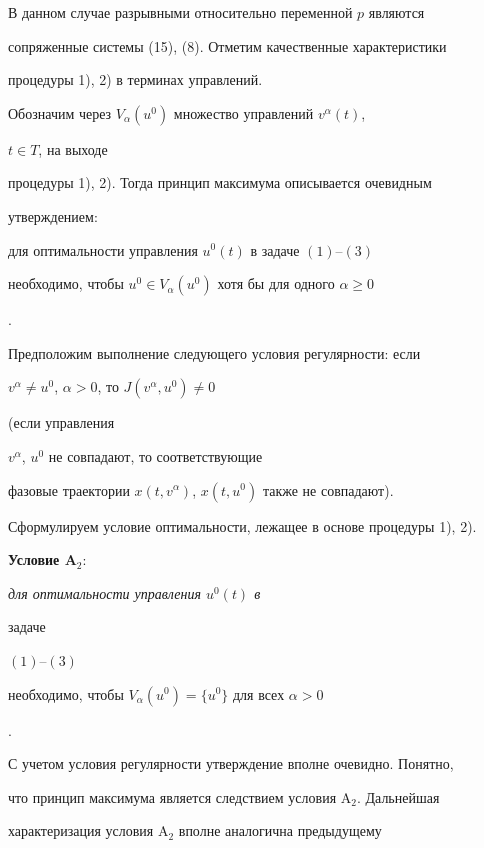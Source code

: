  


В данном случае разрывными относительно переменной $p$ являются 


сопряженные системы (15), (8). Отметим качественные характеристики 


процедуры 1), 2) в терминах управлений. 


 


Обозначим через $V_\alpha(u^0)$ множество управлений $v^\alpha(t)$, 


$t\in T$, на выходе 


процедуры 1), 2). Тогда принцип максимума описывается очевидным 


утверждением:


{\it


для оптимальности управления $u^0(t)$ в задаче $(1)$--$(3)$ 


необходимо, чтобы $u^0\in V_\alpha(u^0)$ хотя бы для одного $\alpha\ge 0$


}. 


 


Предположим выполнение следующего условия регулярности: если 


$v^\alpha\ne u^0$, $\alpha>0$, то $J(v^\alpha,u^0)\ne 0$ 


(если управления 


$v^\alpha$, $u^0$ не совпадают, то соответствующие 


фазовые траектории $x(t,v^\alpha)$, $x(t,u^0)$ также не совпадают). 


 


Сформулируем условие оптимальности, лежащее в основе процедуры 1), 2). 


 


{\bf Условие A${}_2$}: {\it для оптимальности управления $u^0(t)$ в 


задаче 


$(1)$--$(3)$ 


необходимо, чтобы $V_\alpha(u^0)=\{u^0\}$ для всех $\alpha>0$}. 


 


С учетом условия регулярности утверждение вполне очевидно. Понятно, 


что принцип максимума является следствием условия A${}_2$. Дальнейшая 


характеризация условия A${}_2$ вполне аналогична предыдущему 


